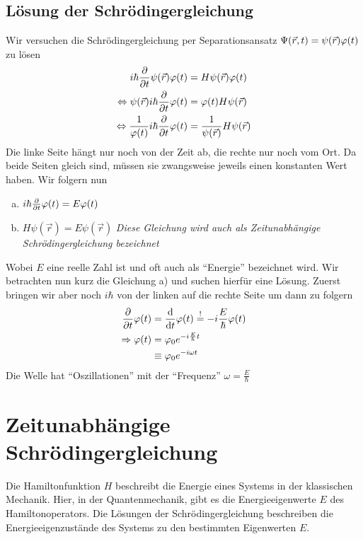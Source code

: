 \subsection{Lösung der Schrödingergleichung}
Wir versuchen die Schrödingergleichung per Separationsansatz $\Psi(\vec{r}, t) = \psi(\vec{r}) \varphi(t)$ zu lösen
\begin{align*}
	i \hbar \frac{\partial}{\partial t} \psi(\vec{r}) \varphi(t) &= H \psi(\vec{r}) \varphi(t)\\
	\Leftrightarrow \psi(\vec{r}) i \hbar \frac{\partial}{\partial t} \varphi(t) &= \varphi(t) H \psi(\vec{r})\\
	\Leftrightarrow \frac{1}{\varphi(t)} i \hbar \frac{\partial}{\partial t} \varphi(t) &= \frac{1}{\psi(\vec{r})} H \psi(\vec{r})
\end{align*}
Die linke Seite hängt nur noch von der Zeit ab, die rechte nur noch vom Ort. Da beide Seiten gleich sind, müssen sie zwangsweise jeweils einen konstanten Wert haben. Wir folgern nun 
\begin{enumerate}[a)]
	 \item $i \hbar \frac{\partial}{\partial t} \varphi(t) = E \varphi(t)$
	 \item $H \psi(\vec{r}) = E \psi(\vec{r})$ \textit{Diese Gleichung wird auch als Zeitunabhängige Schrödingergleichung bezeichnet}
\end{enumerate}
Wobei $E$ eine reelle Zahl ist und oft auch als "`Energie"' bezeichnet wird. Wir betrachten nun kurz die Gleichung a) und suchen hierfür eine Lösung.
Zuerst bringen wir aber noch $i \hbar$ von der linken auf die rechte Seite um dann zu folgern
\begin{align*}
	\frac{\partial}{\partial t} \varphi(t) &= \frac{\mathrm d}{\mathrm d t} \varphi(t) \overset!= - i \frac{E}{\hbar} \varphi(t)\\
	\Rightarrow \varphi(t) &= \varphi_0 e^{-i\frac{E}{\hbar} t}\\
	&\equiv \varphi_0 e^{-i \omega t}
\end{align*}
Die Welle hat "`Oszillationen"' mit der "`Frequenz"' $\omega = \frac{E}{\hbar}$

\section{Zeitunabhängige Schrödingergleichung}
Die Hamiltonfunktion $H$ beschreibt die Energie eines Systems in der klassischen Mechanik. Hier, in der Quantenmechanik, gibt es die Energieeigenwerte $E$ des Hamiltonoperators. Die Lösungen der Schrödingergleichung beschreiben die Energieeigenzustände des Systems zu den bestimmten Eigenwerten $E$.

